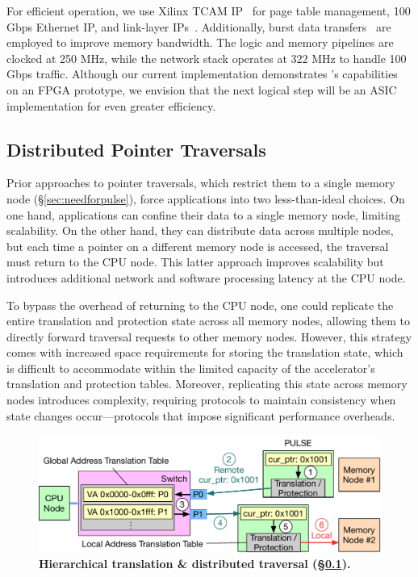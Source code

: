 For efficient operation, we use Xilinx TCAM IP~\cite{tcam_ip} for page table management, 100 Gbps Ethernet IP, and link-layer IPs~\cite{xilinx_network}. Additionally, burst data transfers~\cite{burstdatatransfer} are employed to improve memory bandwidth. The logic and memory pipelines are clocked at 250 MHz, while the network stack operates at 322 MHz to handle 100 Gbps traffic. Although our current implementation demonstrates \pulse's capabilities on an FPGA prototype, we envision that the next logical step will be an ASIC implementation for even greater efficiency.

\subsection{Distributed Pointer Traversals}
\label{ssec:pulsedistributed}

Prior approaches to pointer traversals, which restrict them to a single memory node (\S\ref{sec:needforpulse}), force applications into two less-than-ideal choices. On one hand, applications can confine their data to a single memory node, limiting scalability. On the other hand, they can distribute data across multiple nodes, but each time a pointer on a different memory node is accessed, the traversal must return to the CPU node. This latter approach improves scalability but introduces additional network and software processing latency at the CPU node.

To bypass the overhead of returning to the CPU node, one could replicate the entire translation and protection state across all memory nodes, allowing them to directly forward traversal requests to other memory nodes. However, this strategy comes with increased space requirements for storing the translation state, which is difficult to accommodate within the limited capacity of the accelerator's translation and protection tables. Moreover, replicating this state across memory nodes introduces complexity, requiring protocols to maintain consistency when state changes occur—protocols that impose significant performance overheads.


\begin{figure}[t]
\centering
\includegraphics[width=0.96\columnwidth]{fig/pulse/hierarchical.pdf}
\caption[Hierarchical translation \& distributed traversal]{\textbf{Hierarchical translation \& distributed traversal (\S\ref{ssec:pulsedistributed}).}}
\label{fig:hierarchical}
\end{figure}

